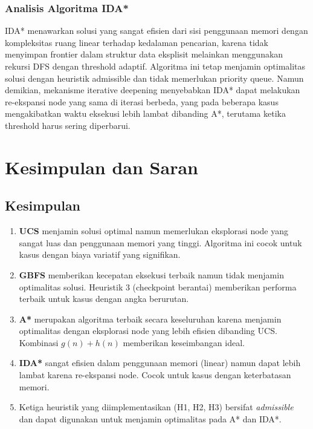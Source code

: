 \documentclass[12pt,a4paper]{article}
\begin{document}
\subsubsection{Analisis Algoritma IDA* }

IDA* menawarkan solusi yang sangat efisien dari sisi penggunaan memori dengan kompleksitas ruang linear terhadap kedalaman pencarian, karena tidak menyimpan frontier dalam struktur data eksplisit melainkan menggunakan rekursi DFS dengan threshold adaptif. Algoritma ini tetap menjamin optimalitas solusi dengan heuristik admissible dan tidak memerlukan priority queue. Namun demikian, mekanisme iterative deepening menyebabkan IDA* dapat melakukan re-ekspansi node yang sama di iterasi berbeda, yang pada beberapa kasus mengakibatkan waktu eksekusi lebih lambat dibanding A*, terutama ketika threshold harus sering diperbarui.


\section{Kesimpulan dan Saran}

\subsection{Kesimpulan}
\begin{enumerate}[label=\arabic*., leftmargin=2em]
  \item \textbf{UCS} menjamin solusi optimal namun memerlukan eksplorasi node yang sangat luas dan penggunaan memori yang tinggi. Algoritma ini cocok untuk kasus dengan biaya variatif yang signifikan.
  
  \item \textbf{GBFS} memberikan kecepatan eksekusi terbaik namun tidak menjamin optimalitas solusi. Heuristik 3 (checkpoint berantai) memberikan performa terbaik untuk kasus dengan angka berurutan.
  
  \item \textbf{A*} merupakan algoritma terbaik secara keseluruhan karena menjamin optimalitas dengan eksplorasi node yang lebih efisien dibanding UCS. Kombinasi $g(n) + h(n)$ memberikan keseimbangan ideal.
  
  \item \textbf{IDA*} sangat efisien dalam penggunaan memori (linear) namun dapat lebih lambat karena re-ekspansi node. Cocok untuk kasus dengan keterbatasan memori.
  
  \item Ketiga heuristik yang diimplementasikan (H1, H2, H3) bersifat \textit{admissible} dan dapat digunakan untuk menjamin optimalitas pada A* dan IDA*.
\end{enumerate}
\end{document}
